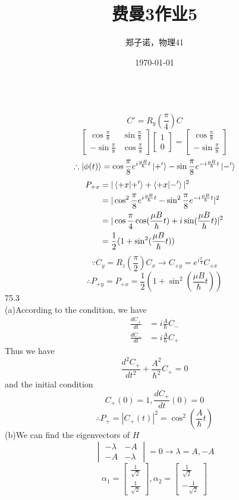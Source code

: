 \documentclass[utf8]{ctexart}
\title{费曼3作业5}
\author{郑子诺，物理41}
\date{\today}
\begin{document}
\maketitle
{}\\
\[C'=R_{y}(\frac{\pi}{4})C\]
\[\begin{bmatrix}
	\cos\frac{\pi}{8}&\sin\frac{\pi}{8}\\
	-\sin\frac{\pi}{8}&\cos\frac{\pi}{8}
\end{bmatrix}
\begin{bmatrix}
	1\\
	0
\end{bmatrix}
=\begin{bmatrix}
	\cos\frac{\pi}{8}\\
	-\sin\frac{\pi}{8}
\end{bmatrix}\]
\[\therefore\ket{\phi(t)}=\cos\frac{\pi}{8}e^{i\frac{\mu B}{\hbar}t}\ket{+'}-\sin\frac{\pi}{8}e^{-i\frac{\mu B}{\hbar}t}\ket{-'}\]
\begin{align*}
	P_{+x}&=|\braket{+x|+'}+\braket{+x|-'}|^2\\
	&=|\cos^2\frac{\pi}{8}e^{i\frac{\mu B}{\hbar}t}-\sin^2\frac{\pi}{8}e^{-i\frac{\mu B}{\hbar}t}|^2\\
	&=|\cos\frac{\pi}{4}\cos(\frac{\mu B}{\hbar}t)+i\sin(\frac{\mu B}{\hbar}t)|^2\\
	&=\frac{1}{2}(1+\sin^2(\frac{\mu B}{\hbar}t))
\end{align*}
\[\because C_y=R_z(\frac{\pi}{2})C_x\rightarrow C_{+y}=e^{i\frac{\pi}{4}}C_{+x}\]
\[\therefore P_{+y}=P_{+x}=\frac{1}{2}(1+\sin^2(\frac{\mu B}{\hbar}t))\]
75.3\\
(a)According to the condition, we have
\begin{align*}
	\frac{dC_+}{dt}&=i\frac{A}{\hbar}C_-\\
	\frac{dC_-}{dt}&=i\frac{A}{\hbar}C_+
\end{align*}
Thus we have
\[\frac{d^2C_+}{dt^2}+\frac{A^2}{\hbar^2}C_+=0\]
and the initial condition
\[C_+(0)=1,\frac{dC_+}{dt}(0)=0\]
\[\therefore P_+=|C_+(t)|^2=\cos^2(\frac{A}{\hbar}t)\]
(b)We can find the eigenvectors of $H$
\[\begin{vmatrix}
	-\lambda&-A\\
	-A&-\lambda
\end{vmatrix}=0\rightarrow\lambda=A,-A\]
\[\alpha_1=\begin{bmatrix}
	\frac{1}{\sqrt{2}}\\
	\frac{1}{\sqrt{2}}
\end{bmatrix},\alpha_2=\begin{bmatrix}
\frac{1}{\sqrt{2}}\\
-\frac{1}{\sqrt{2}}
\end{bmatrix}\]
\end{document}
